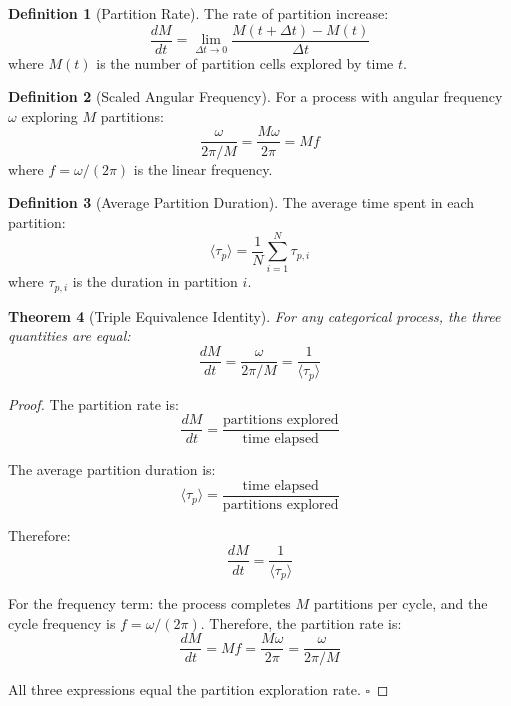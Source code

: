 \documentclass[twocolumn,10pt]{article}
\newtheorem{theorem}{Theorem}[section]
\theoremstyle{definition}
\newtheorem{definition}[theorem]{Definition}
\theoremstyle{remark}
\begin{document}
\begin{definition}[Partition Rate]
The rate of partition increase:
\begin{equation}
    \frac{dM}{dt} = \lim_{\Delta t \to 0} \frac{M(t + \Delta t) - M(t)}{\Delta t}
\end{equation}
where $M(t)$ is the number of partition cells explored by time $t$.
\end{definition}

\begin{definition}[Scaled Angular Frequency]
For a process with angular frequency $\omega$ exploring $M$ partitions:
\begin{equation}
    \frac{\omega}{2\pi/M} = \frac{M \omega}{2\pi} = M f
\end{equation}
where $f = \omega/(2\pi)$ is the linear frequency.
\end{definition}

\begin{definition}[Average Partition Duration]
The average time spent in each partition:
\begin{equation}
    \langle \tau_p \rangle = \frac{1}{N} \sum_{i=1}^{N} \tau_{p,i}
\end{equation}
where $\tau_{p,i}$ is the duration in partition $i$.
\end{definition}

\begin{theorem}[Triple Equivalence Identity]
\label{thm:triple_identity}
For any categorical process, the three quantities are equal:
\begin{equation}
    \frac{dM}{dt} = \frac{\omega}{2\pi/M} = \frac{1}{\langle \tau_p \rangle}
\end{equation}
\end{theorem}

\begin{proof}
The partition rate is:
\begin{equation}
    \frac{dM}{dt} = \frac{\text{partitions explored}}{\text{time elapsed}}
\end{equation}

The average partition duration is:
\begin{equation}
    \langle \tau_p \rangle = \frac{\text{time elapsed}}{\text{partitions explored}}
\end{equation}

Therefore:
\begin{equation}
    \frac{dM}{dt} = \frac{1}{\langle \tau_p \rangle}
\end{equation}

For the frequency term: the process completes $M$ partitions per cycle, and the cycle frequency is $f = \omega/(2\pi)$. Therefore, the partition rate is:
\begin{equation}
    \frac{dM}{dt} = M f = \frac{M \omega}{2\pi} = \frac{\omega}{2\pi/M}
\end{equation}

All three expressions equal the partition exploration rate. $\square$
\end{proof}
\end{document}
